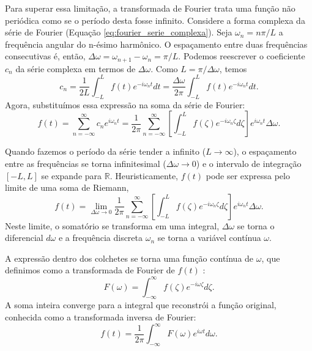 Para superar essa limitação, a transformada de Fourier trata uma função não periódica como se o período desta fosse infinito. Considere a forma complexa da série de Fourier (Equação \ref{eq:fourier_serie_complexa}). Seja \(\omega_n = n\pi/L\) a frequência angular do n-ésimo harmônico. O espaçamento entre duas frequências consecutivas é, então, \(\Delta\omega = \omega_{n+1} - \omega_n = \pi/L\). Podemos reescrever o coeficiente \(c_n\) da série complexa em termos de \(\Delta\omega\). Como \(L = \pi/\Delta\omega\), temos
\begin{equation*}
    c_n = \frac{1}{2L}\int_{-L}^{L} f(t) e^{-i \omega_n t} dt = \frac{\Delta\omega}{2\pi}\int_{-L}^{L} f(t) e^{-i \omega_n t} dt.
\end{equation*}
Agora, substituímos essa expressão na soma da série de Fourier:
\begin{equation*}
    f(t) = \sum_{n=-\infty}^{\infty} c_n e^{i \omega_n t} = \frac{1}{2\pi} \sum_{n=-\infty}^{\infty} \left[
      \int_{-L}^{L} f(\zeta) e^{-i \omega_n \zeta} d\zeta \right] e^{i \omega_n t} \Delta\omega.
\end{equation*}

Quando fazemos o período da série tender a infinito (\(L \to \infty\)), o espaçamento entre as frequências se torna infinitesimal (\(\Delta\omega \to 0\)) e o intervalo de integração \([-L, L]\) se expande para \(\mathbb{R}\). Heuristicamente, \(f(t)\) pode ser expressa pelo limite de uma soma de Riemann,
\begin{equation*}
    f(t) = \lim_{\Delta\omega \to 0} \frac{1}{2\pi} \sum_{n=-\infty}^{\infty} \left[
      \int_{-L}^{L} f(\zeta) e^{-i \omega_n \zeta} d\zeta \right] e^{i \omega_n t} \Delta\omega.
\end{equation*}
Neste limite, o somatório se transforma em uma integral, \(\Delta\omega\) se torna o diferencial \(d\omega\) e a frequência discreta \(\omega_n\) se torna a variável contínua \(\omega\). 

A expressão dentro dos colchetes se torna uma função contínua de \(\omega\), que definimos como a transformada de Fourier de \(f(t)\) \cite{vidakovic_statistical_1999}:
\begin{equation}
    F(\omega) = \int_{-\infty}^{\infty} f(\zeta) e^{-i\omega \zeta} d\zeta.
    \label{eq:eq_5_fourier_transform}
\end{equation}
A soma inteira converge para a integral que reconstrói a função original, conhecida como a transformada inversa de Fourier:
\begin{equation*}
    f(t) = \frac{1}{2\pi} \int_{-\infty}^{\infty} F(\omega) e^{i\omega t} d\omega.
\end{equation*}

